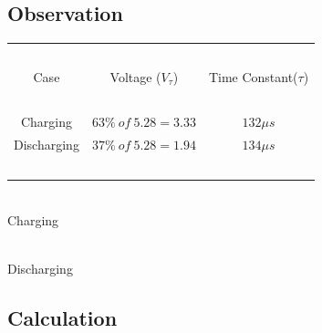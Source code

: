 \documentclass{article}
\begin{document}
\subsection{Observation}
\vspace{5px}
\begin{center}
\begin{tabular}{|c | c | c |} 
 \hline
    \ & \ & \ \\
    Case & Voltage ($V_\tau$) & Time Constant($\tau$) \\ [1em]
    \hline
    \ & \ & \ \\
    Charging & $63\% \ of \ 5.28=3.33$ & $132\mu s$  \\
    Discharging & $37\% \ of \ 5.28=1.94$ & $134\mu s$  \\
    \ & \ & \ \\
 \hline
\end{tabular}
\end{center}
\vspace{10px}
\begin{multicols}{2}
\begin{center}
 \\ \vspace{5px}
Charging \\

\columnbreak

 \\ \vspace{5px}
Discharging
\end{center}
\end{multicols}

\vspace{10px}

\subsection{Calculation}
\end{document}
